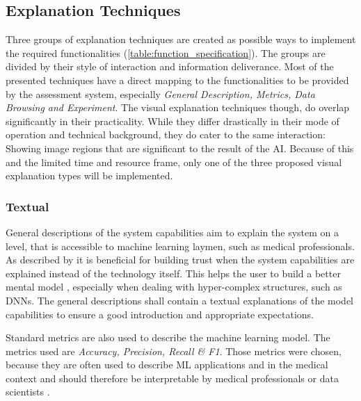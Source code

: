 \documentclass[11pt,a4paper,english]{scrreprt}
\begin{document}
\subsection{Explanation Techniques}\label{subsection:explanation_techniques}
Three groups of explanation techniques are created as possible ways to implement the required functionalities (\autoref{table:function_specification}). The groups are divided by their style of interaction and information deliverance. Most of the presented techniques have a direct mapping to the functionalities to be provided by the assessment system, especially \textit{General Description, Metrics, Data Browsing and Experiment}. The visual explanation techniques though, do overlap significantly in their practicality. While they differ drastically in their mode of operation and technical background, they do cater to the same interaction: Showing image regions that are significant to the result of the AI. Because of this and the limited time and resource frame, only one of the three proposed visual explanation types will be implemented.
\subsubsection*{Textual}
\begin{description}[font=\normalfont\itshape]
    \item[General Description:] General descriptions of the system capabilities aim to explain the system on a level, that is accessible to machine learning laymen, such as medical professionals. As described by \textcite{people_ai_google_website} it is beneficial for building trust when the system capabilities are explained instead of the technology itself. This helps the user to build a better mental model \parencite[p.3]{hoffman_metrics_2019}, especially when dealing with hyper-complex structures, such as DNNs. The general descriptions shall contain a textual explanations of the model capabilities to ensure a good introduction and appropriate expectations.
    \item[Metrics:] Standard metrics are also used to describe the machine learning model. The metrics used are \textit{Accuracy, Precision, Recall \& F1}. Those metrics were chosen, because they are often used to describe ML applications and in the medical context and should therefore be interpretable by medical professionals or data scientists \parencite{sokolova_beyond_2006,hicks_evaluation_2021}. 
\end{description}
\end{document}
